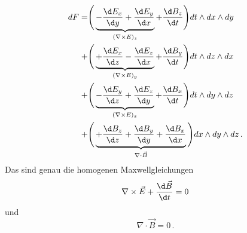 \begin{align*}
	dF =
	&\Bigg( \underbrace{ - \frac{\d E_x}{\d y} + \frac{\d E_y}{\d x}}_{(\nabla \times E)_z} + \frac{\d B_z}{\d t} \Bigg) dt \wedge dx \wedge dy
	\\
	+&\Bigg( \underbrace{ + \frac{\d E_x}{\d z} - \frac{\d E_z}{\d x}}_{(\nabla \times E)_y} + \frac{\d B_y}{\d t} \Bigg) dt \wedge dz \wedge dx
	\\
	+&\Bigg( \underbrace{ - \frac{\d E_y}{\d z} + \frac{\d E_z}{\d y}}_{(\nabla \times E)_x} + \frac{\d B_x}{\d t} \Bigg) dt \wedge dy \wedge dz
	\\
	+&\Bigg( \underbrace{ + \frac{\d B_z}{\d z} + \frac{\d B_y}{\d y} + \frac{\d B_x}{\d x}}_{\nabla \cdot \vec{B}} \Bigg) dx \wedge dy \wedge dz \, .
\end{align*}
Das sind genau die homogenen Maxwellgleichungen
\[
\nabla \times \vec{E} + \frac{\d \vec{B}}{\d t} = 0
\]
und
\[
\nabla \cdot \vec{B} = 0 \, .
\]
